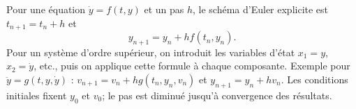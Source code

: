 \begin{corrigebox}
Pour une équation $\dot y=f(t,y)$ et un pas $h$, le schéma d'Euler
        explicite est $t_{n+1}=t_n+h$ et
        \[\boxed{y_{n+1}=y_n+h f(t_n,y_n)}.\]
        Pour un système d'ordre supérieur, on introduit les variables d'état
        $x_1=y$, $x_2=\dot y$, etc., puis on applique cette formule à chaque composante.
        Exemple pour $\ddot y=g(t,y,\dot y)$ :
        $v_{n+1}=v_n+h g(t_n,y_n,v_n)$ et $y_{n+1}=y_n+h v_n$.
        Les conditions initiales fixent $y_0$ et $v_0$; le pas est diminué jusqu'à
        convergence des résultats.
\end{corrigebox}
